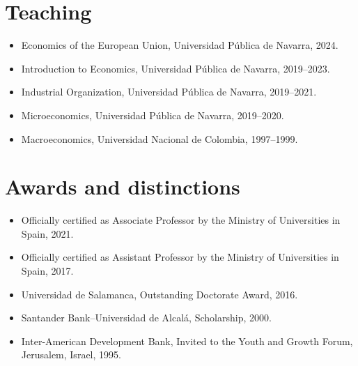 \documentclass[11pt]{article}\usepackage[]{graphicx}\usepackage[usenames,dvipsnames]{xcolor}
\begin{document}
\section{Teaching} 
\begin{itemize}
  \item Economics of the European Union, Universidad Pública de Navarra, 2024.
  \item Introduction to Economics, Universidad Pública de Navarra, 2019--2023.
  \item Industrial Organization, Universidad Pública de Navarra, 2019--2021.
  \item Microeconomics, Universidad Pública de Navarra, 2019--2020.
  \item Macroeconomics, Universidad Nacional de Colombia, 1997--1999.
\end{itemize}

\section{Awards and distinctions} 
\begin{itemize}
  \item Officially certified as Associate Professor by the Ministry of Universities in Spain, 2021.
  \item Officially certified as Assistant Professor by the Ministry of Universities in Spain, 2017.
  \item Universidad de Salamanca, Outstanding Doctorate Award, 2016.
  \item Santander Bank--Universidad de Alcalá, Scholarship, 2000.
  \item Inter-American Development Bank, Invited to the Youth and Growth Forum, Jerusalem, Israel, 1995.
\end{itemize}
\end{document}
